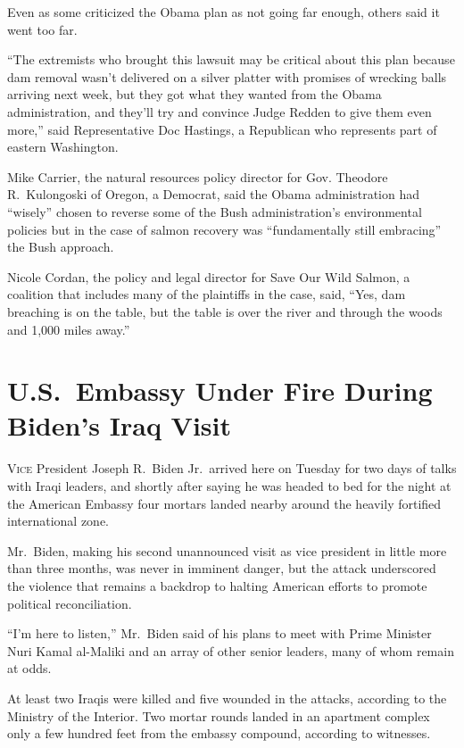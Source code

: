 ﻿\documentclass[12pt]{article}
\begin{document}
Even as some criticized the Obama plan as not going far enough, others said it went too far.

``The extremists who brought this lawsuit may be critical about this plan because dam removal wasn't
delivered on a silver platter with promises of wrecking balls arriving next week, but they got what
they wanted from the Obama administration, and they'll try and convince Judge Redden to give them
even more,'' said Representative Doc Hastings, a Republican who represents part of eastern
Washington.

Mike Carrier, the natural resources policy director for Gov. Theodore R.~Kulongoski of Oregon, a
Democrat, said the Obama administration had ``wisely'' chosen to reverse some of the Bush
administration's environmental policies but in the case of salmon recovery was ``fundamentally still
embracing'' the Bush approach.

Nicole Cordan, the policy and legal director for Save Our Wild Salmon, a coalition that includes
many of the plaintiffs in the case, said, ``Yes, dam breaching is on the table, but the table is
over the river and through the woods and 1,000 miles away.''

\section{U.S.~Embassy Under Fire During Biden's Iraq Visit}

\lettrine{V}{ice} President Joseph R.~Biden Jr.~arrived here on Tuesday for two days of talks with
Iraqi leaders, and shortly after saying he was headed to bed for the night at the American Embassy
four mortars landed nearby around the heavily fortified international zone.

Mr.~Biden, making his second unannounced visit as vice president in little more than three months,
was never in imminent\cite{imminent} danger, but the attack underscored the violence that remains a
backdrop to halting American efforts to promote political reconciliation.

``I'm here to listen,'' Mr.~Biden said of his plans to meet with Prime Minister Nuri Kamal al-Maliki
and an array of other senior leaders, many of whom remain at odds.

At least two Iraqis were killed and five wounded in the attacks, according to the Ministry of the
Interior. Two mortar rounds landed in an apartment complex only a few hundred feet from the embassy
compound, according to witnesses.
\end{document}
